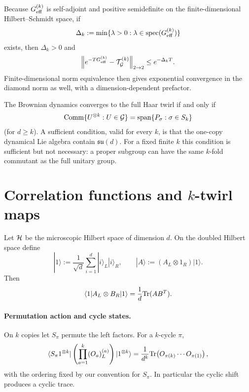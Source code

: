 \documentclass{article}
\theoremstyle{definition}
\begin{document}
Because $G_{\rm eff}^{(k)}$ is self-adjoint and positive semidefinite on the
finite-dimensional Hilbert--Schmidt space, if
\begin{equation}
    \Delta_k
    :=\min\{\lambda>0:\lambda\in{\rm spec}(G_{\rm eff}^{(k)})\}
\end{equation}
exists, then $\Delta_k>0$ and
\begin{equation}
    \left\|
       e^{-TG_{\rm eff}^{(k)}}-{\cal T}_{\cal G}^{(k)}
    \right\|_{2\to2}
    \le e^{-\Delta_kT}.
\end{equation}
Finite-dimensional norm equivalence then gives exponential convergence in
the diamond norm as well, with a dimension-dependent prefactor.

The Brownian dynamics converges to the full Haar twirl if and only if
\begin{equation}
    {\rm Comm}\{U^{\otimes k}:U\in{\cal G}\}
    ={\rm span}\{P_\sigma:\sigma\in S_k\}
\end{equation}
(for $d\ge k$).  A sufficient condition, valid for every $k$, is that the
one-copy dynamical Lie algebra contain $\mathfrak{su}(d)$.  For a fixed
finite $k$ this condition is sufficient but not necessary: a proper
subgroup can have the same $k$-fold commutant as the full unitary group.


\appendix
\section{Correlation functions and $k$-twirl maps}

Let ${\cal H}$ be the microscopic Hilbert space of dimension $d$.  On the
doubled Hilbert space define
\begin{equation}
    |1\rangle
    :=\frac1{\sqrt d}\sum_{i=1}^d|i\rangle_L|i\rangle_R,
    \qquad
    |A\rangle:=(A_L\otimes1_R)|1\rangle.
\end{equation}
Then
\begin{equation}
    \langle1|A_L\otimes B_R|1\rangle
    =\frac1d{\rm Tr}(AB^T).
\end{equation}

\paragraph{Permutation action and cycle states.}
On $k$ copies let $S_\pi$ permute the left factors.  For a $k$-cycle
$\pi$,
\begin{equation}
    \langle S_\pi1^{\otimes k}|
    \left(\prod_{a=1}^k(O_a)_L^{(a)}\right)
    |1^{\otimes k}\rangle
    =\frac1{d^k}
      {\rm Tr}\!\left(O_{\pi(k)}\cdots O_{\pi(1)}\right),
\end{equation}
with the ordering fixed by our convention for $S_\pi$.  In particular the
cyclic shift produces a cyclic trace.
\end{document}
